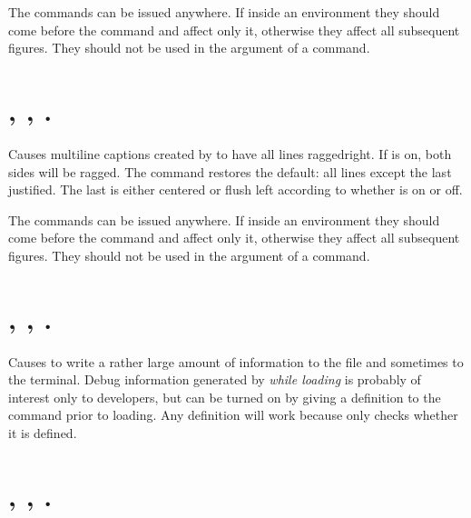 \documentclass[letterpaper]{article}
\begin{document}
The commands can be issued anywhere. If inside an 
environment they should come before the  command and affect
only it, otherwise they affect all subsequent figures. They should not
be used in the argument of a  command.

\section{, ,
.}\label{raggedcaptions}
%
%

Causes multiline captions created by  to have all lines
raggedright. If  is on, both sides will be ragged.
The command  restores the default: all lines except
the last justified. The last is either centered or flush left according
to whether  is on or off.

The commands can be issued anywhere. If inside an 
environment they should come before the  command and affect
only it, otherwise they affect all subsequent figures. They should not
be used in the argument of a  command.

\section{, ,
.}\label{debug}
%
%

Causes \mfp{} to write a rather large amount of information to the
 file and sometimes to the terminal. Debug information
generated by  \emph{while loading} is probably of
interest only to developers, but can be turned on by giving a definition
to the command  prior to loading. Any definition will
work because  only checks whether it is defined.

\section{, , .}
%
%
\end{document}
